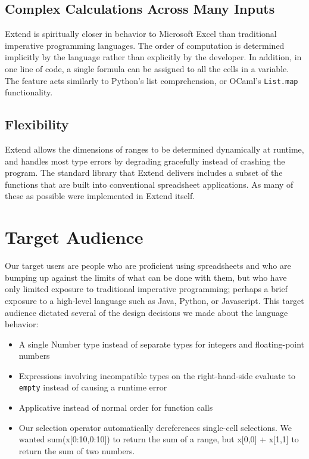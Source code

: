 	\subsection{Complex Calculations Across Many Inputs}
	Extend is spiritually closer in behavior to Microsoft Excel than traditional imperative programming languages. The order of computation is determined implicitly by the language rather than explicitly by the developer. In addition, in one line of code, a single formula can be assigned to all the cells in a variable. The feature acts similarly to Python's list comprehension, or OCaml's \texttt{List.map} functionality.

	\subsection{Flexibility}
	Extend allows the dimensions of ranges to be determined dynamically at runtime, and handles most type errors by degrading gracefully instead of crashing the program. The standard library that Extend delivers includes a subset of the functions that are built into conventional spreadsheet applications. As many of these as possible were implemented in Extend itself.

\section{Target Audience}
Our target users are people who are proficient using spreadsheets and who are bumping up against the limits of what can be done with them, but who have only limited exposure to traditional imperative programming; perhaps a brief exposure to a high-level language such as Java, Python, or Javascript. This target audience dictated several of the design decisions we made about the language behavior:
\begin{itemize}
	\item A single Number type instead of separate types for integers and floating-point numbers
	\item Expressions involving incompatible types on the right-hand-side evaluate to \texttt{empty} instead of causing a runtime error
	\item Applicative instead of normal order for function calls
	\item Our selection operator automatically dereferences single-cell selections. We wanted sum(x[0:10,0:10]) to return the sum of a range, but x[0,0] + x[1,1] to return the sum of two numbers.
\end{itemize}
